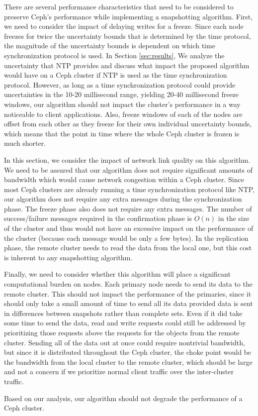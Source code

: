 There are several performance characteristics that need to be
considered to preserve Ceph's performance while implementing a
snapshotting algorithm. First, we need to consider the impact of
delaying writes for a freeze. Since each node freezes for twice the
uncertainty bounds that is determined by the time protocol, the
magnitude of the uncertainty bounds is dependent on which time
synchronization protocol is used. In Section \ref{sec:results}, We
analyze the uncertainty that NTP provides and discuss what impact the
proposed algorithm would have on a Ceph cluster if NTP is used as the
time synchronization protocol. However, as long as a time
synchronization protocol could provide uncertainties in the 10-20
millisecond range, yielding 20-40 millisecond
freeze %
windows, our algorithm should not impact the cluster's performance in
a way noticeable to client applications.  Also, freeze windows of each
of the nodes are offset from each other as they freeze for their own
individual uncertainty bounds, which means that the point in time
where the whole Ceph cluster is frozen is much shorter.

In this section, we consider the impact of network link quality on
this algorithm. We need to be assured that our algorithm does not
require significant amounts of bandwidth which would cause network
congestion within a Ceph cluster. Since most Ceph clusters are already
running a time synchronization protocol like NTP, our algorithm does
not require any extra messages during the synchronization phase. The
freeze phase also does not require any extra messages. The number of
success/failure messages required in the confirmation phase is $O(n)$
in the size of the cluster and thus would not have an excessive impact
on the performance of the cluster (because each message would be only
a few bytes). In the replication phase, the remote cluster needs to
read the data from the local one, but this cost is inherent to any
snapshotting algorithm.

Finally, we need to consider whether this algorithm will place a
significant computational burden on nodes. Each primary node needs to
send its data to the remote cluster. This should not impact the
performance of the primaries, since it should only take a small amount
of time to send all its data provided data is sent in differences
between snapshots rather than complete sets. Even if it did take some
time to send the data, read and write requests could still be
addressed by prioritizing those requests above the requests for the
objects from the remote cluster. Sending all of the data out at once
could require nontrivial bandwidth, but since it is distributed
throughout the Ceph cluster, the choke point would be the bandwidth
from the local cluster to the remote cluster, which should be large
and not a concern if we prioritize normal client traffic over the
inter-cluster traffic.

Based on our analysis, our algorithm should not degrade the
performance of a Ceph cluster.
